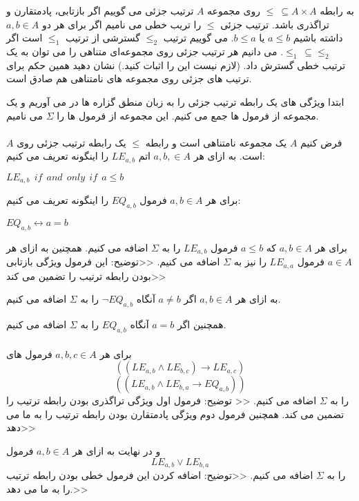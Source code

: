 
به رابطه 
$\leq \ \subseteq A \times A$
روی مجموعه
$A$
ترتیب جزئی می گوییم اگر بازتابی، پادمتقارن و تراگذری باشد. ترتیب جزئی
$\leq$
را تریب خطی می نامیم اگر برای هر دو
$a,b\in A$
داشته باشیم 
$a\leq b$
یا
$b\leq a$.
می گوییم ترتیب 
$\leq_2$
گسترشی از ترتیب 
$\leq_1$
است اگر 
$\leq_1\ \subseteq \leq_2$.
می دانیم هر ترتیب جزئی روی مجموعه‌ای متناهی را می توان به یک ترتیب خطی گسترش داد. 
(لازم نیست این را اثبات کنید.)
نشان دهید همین حکم برای ترتیب های جزئی روی مجموعه های نامتناهی هم صادق است.
\begin{ans}
    ابتدا ویژگی های یک رابطه ترتیب جزئی را به زبان منطق گزاره ها در می آوریم و یک مجموعه از فرمول ها جمع می کنیم. این مجموعه از فرمول ها را 
    $\Sigma$
    می نامیم.
    \\
    \\
    فرض کنیم 
    $A$
    یک مجموعه نامتناهی است و رابطه 
    $\leq$
    یک رابطه ترتیب جزئی روی 
    $A$
    است. به ازای هر 
    $a,b, \in A$
    اتم 
    $LE_{a,b}$
    را اینگونه تعریف می کنیم:
    \begin{flushleft}
        $LE_{a,b} \ \ if \ \ and \ \ only \ \ if \ \ a \leq b$
    \end{flushleft}
    برای هر 
    $a,b \in A$
    فرمول
    $EQ_{a,b}$
    را اینگونه تعریف می کنیم:
    \begin{flushleft}
        $EQ_{a,b} \leftrightarrow a = b$
    \end{flushleft}

    برای هر 
    $a,b \in A$
    که 
    $a \leq b$
    فرمول 
    $LE_{a,b}$
    را به 
    $\Sigma$
    اضافه می کنیم. همچنین به ازای هر 
    $a\in A$
    فرمول 
    $LE_{a,a}$
    را نیز به 
    $\Sigma$
    اضافه می کنیم. 
    <<توضیح: این فرمول ویژگی بازتابی بودن رابطه ترتیب را تضمین می کند>>

    به ازای هر 
    $a,b \in A$
    اگر 
    $a \neq b$
    آنگاه 
    $\neg EQ_{a,b}$
    را به 
    $\Sigma$
    اضافه می کنیم.

    همچنین اگر 
    $a = b$
    آنگاه 
    $EQ_{a,b}$
    را به 
    $\Sigma$
    اضافه می کنیم. 
    \\
    \\
    برای هر 
    $a,b,c \in A$
    فرمول های
    \[((LE_{a,b}\land LE_{b,c})\rightarrow LE_{a,c})\]
    \[((LE_{a,b}\land LE_{b,a}\rightarrow EQ_{a,b}))\]
    را به 
    $\Sigma$
    اضافه می کنیم.
    << توضیح: فرمول اول ویژگی تراگذری بودن رابطه ترتیب را تضمین می کند. همچنین فرمول دوم ویژگی پادمتقارن بودن رابطه ترتیب را به ما می دهد>>

    و در نهایت به ازای هر 
    $a,b \in A$
    فرمول 
    \[LE_{a,b} \lor LE_{b,a}\]
    را به 
    $\Sigma$
    اضافه می کنیم.
    <<توضیح: اضافه کردن این فرمول خطی بودن رابطه ترتیب را به ما می دهد.>>


\end{ans}
